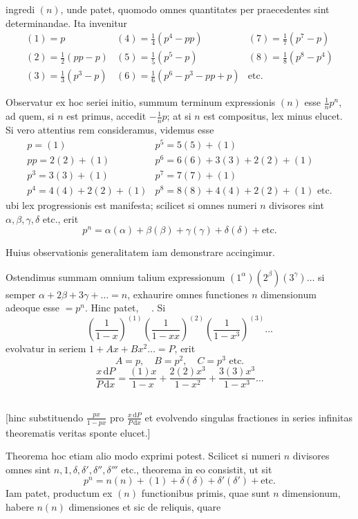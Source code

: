 %
ingredi $(n)$, unde patet, quomodo omnes quantitates per praecedentes sint determinandae. Ita invenitur
\[
\begin{array}{lll}
(1)=p&(4)=\frac14(p^4-pp)&(7)=\frac17(p^7-p)\\
(2)=\frac12(pp-p)&(5)=\frac15(p^5-p)&(8)=\frac18(p^8-p^4)\\
(3)=\frac13(p^3-p)&(6)=\frac16(p^6-p^3-pp+p)&\text{etc.}
\end{array}
\]

Observatur ex hoc seriei initio, summum terminum expressionis $(n)$ esse $\frac1n p^n$, ad quem, si $n$ est primus, accedit $-\frac1n p$; at si $n$ est compositus, lex minus elucet. Si vero attentius rem consideramus, videmus esse
\[
\begin{array}{ll}
p=(1)&p^5=5(5)+(1)\\
pp=2(2)+(1)&p^6=6(6)+3(3)+2(2)+(1)\\
p^3=3(3)+(1)&p^7=7(7)+(1)\\
p^4=4(4)+2(2)+(1)&p^8=8(8)+4(4)+2(2)+(1)\text{ etc.}
\end{array}
\]
ubi lex progressionis est manifesta; scilicet si omnes numeri $n$ divisores sint $\alpha,\beta,\gamma,\delta$ etc., erit
\[
p^n=\alpha(\alpha)+\beta(\beta)+\gamma(\gamma)+\delta(\delta)+\text{etc.}
\]

Huius observationis generalitatem iam demonstrare accingimur.

Ostendimus summam omnium talium expressionum $(1^\alpha)(2^\beta)(3^\gamma)\ldots$ si semper $\alpha+2\beta+3\gamma+\ldots=n$, exhaurire omnes functiones $n$ dimensionum adeoque esse $=p^n$. Hinc patet, \textemdash\ \textemdash\ \textemdash. Si
\[
\left(\frac1{1-x}\right)^{(1)}\left(\frac1{1-xx}\right)^{(2)}\left(\frac1{1-x^3}\right)^{(3)}\ldots
\]
evolvatur in seriem $1+Ax+Bx^2\ldots=P$, erit
\[
A=p,\quad B=p^2,\quad C=p^3\text{ etc.}
\]
\[
\frac{x\,\mathrm{d}P}{P\,\mathrm{d}x}=\frac{(1)x}{1-x}+\frac{2(2)x^3}{1-x^2}+\frac{3(3)x^3}{1-x^3}\ldots
\]
\noindent\hspace*{.28\linewidth}\textemdash\ \textemdash\ \textemdash\ \textemdash

[hinc substituendo $\frac{px}{1-px}$ pro $\frac{x\,\mathrm{d}P}{P\,\mathrm{d}x}$ et evolvendo singulas fractiones in series infinitas theorematis veritas sponte elucet.]

%
Theorema hoc etiam alio modo exprimi potest. Scilicet si numeri $n$ divisores omnes sint $n,1,\delta,\delta',\delta'',\delta'''$ etc., theorema in eo consistit, ut sit
\[
p^n=n(n)+(1)+\delta(\delta)+\delta'(\delta')+\text{etc.}
\]
Iam patet, productum ex $(n)$ functionibus primis, quae sunt $n$ dimensionum, habere $n(n)$ dimensiones et sic de reliquis, quare

